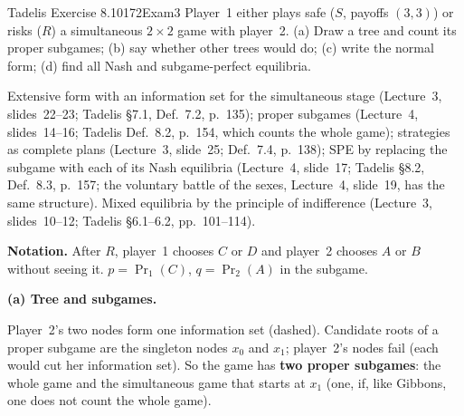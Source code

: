 \begin{exsol}{Tadelis Exercise 8.10}{172}{Exam}{3}
\asked Player~1 either plays safe ($S$, payoffs $(3,3)$) or risks ($R$) a simultaneous
$2\times2$ game with player~2. (a) Draw a tree and count its proper subgames; (b) say whether
other trees would do; (c) write the normal form; (d) find all Nash and subgame-perfect equilibria.

\method Extensive form with an information set for the simultaneous stage (Lecture~3,
slides~22--23; Tadelis \S7.1, Def.~7.2, p.~135); proper subgames (Lecture~4, slides~14--16;
Tadelis Def.~8.2, p.~154, which counts the whole game); strategies as complete plans (Lecture~3,
slide~25; Def.~7.4, p.~138); SPE by replacing the subgame with each of its Nash equilibria
(Lecture~4, slide~17; Tadelis \S8.2, Def.~8.3, p.~157; the voluntary battle of the sexes, Lecture~4,
slide~19, has the same structure). Mixed equilibria by the principle of indifference (Lecture~3,
slides~10--12; Tadelis \S6.1--6.2, pp.~101--114).

\solution
\textbf{Notation.} After $R$, player~1 chooses $C$ or $D$ and player~2 chooses $A$ or $B$
without seeing it. $p = \Pr_1(C)$, $q = \Pr_2(A)$ in the subgame.

\textbf{(a) Tree and subgames.}
\begin{center}
\end{center}
Player~2's two nodes form one information set (dashed). Candidate roots of a proper subgame are
the singleton nodes $x_0$ and $x_1$; player~2's nodes fail (each would cut her information
set). So the game has \textbf{two proper subgames}: the whole game and the simultaneous game that
starts at $x_1$ (one, if, like Gibbons, one does not count the whole game).


\end{exsol}
